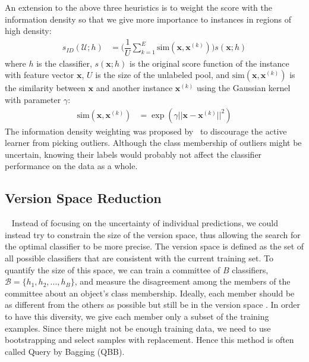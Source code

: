 \documentclass[fleqn,10pt,lineno]{wlpeerj} %
\newcommand{\B}{\mathcal{B}}
\newcommand{\Unlabeled}{\mathcal{U}}
\begin{document}
An extension to the above three heuristics is to weight the score with the
information density so that we give more importance to instances in regions of
high density:
\begin{align}
	s_{ID}(\Unlabeled; h) &=
		\bigg(\dfrac{1}{U} \sum_{k = 1}^E
		\text{sim}(\bm{x}, \bm{x}^{(k)})\bigg) s(\bm{x}; h)
\end{align}
where $h$ is the classifier, $s(\bm{x}; h)$ is the original score function of
the instance with feature vector $\bm{x}$, $U$ is the size of the unlabeled
pool, and $\text{sim}(\bm{x}, \bm{x}^{(k)})$ is the similarity between $\bm{x}$
and another instance $\bm{x}^{(k)}$ using the Gaussian kernel with parameter
$\gamma$:
\begin{align}
	\text{sim}(\bm{x}, \bm{x}^{(k)})
		&= \exp(\gamma ||\bm{x} - \bm{x}^{(k)}||^2) \label{eqn:kernel}
\end{align}
The information density weighting was proposed by~\cite{settles08} to
discourage the active learner from picking outliers. Although the class
membership of outliers might be uncertain, knowing their labels would probably
not affect the classifier performance on the data as a whole.

\subsection{Version Space Reduction}~\label{subsec:version}
Instead of focusing on the uncertainty of individual predictions, we could
instead try to constrain the size of the version space, thus allowing the
search for the optimal classifier to be more precise. The version space is
defined as the set of all possible classifiers that are consistent with the
current training set. To quantify the size of this space, we can train a
committee of $B$ classifiers, $\B = \{h_1, h_2, ..., h_B\}$, and measure the
disagreement among the members of the committee about an object's class
membership. Ideally, each member should be as different from the others as
possible but still be in the version space \citep{melville04}. In order to have
this diversity, we give each member only a subset of the training examples.
Since there might not be enough training data, we need to use bootstrapping and
select samples with replacement. Hence this method is often called Query by
Bagging (QBB).
\end{document}
